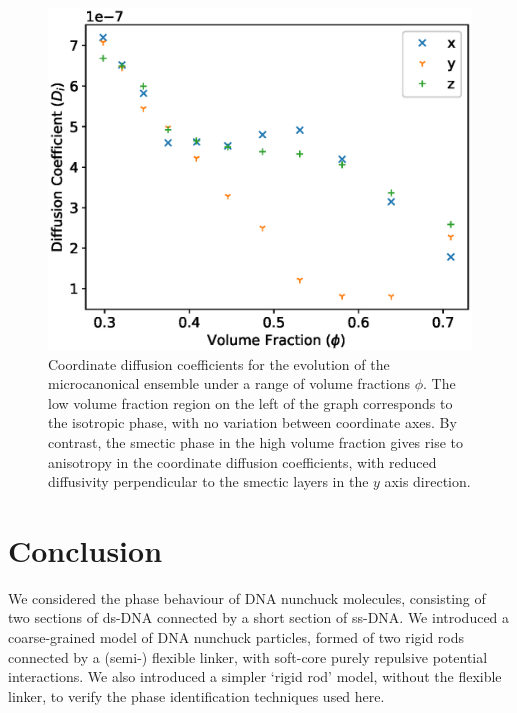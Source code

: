 \documentclass[11pt, a4paper]{article} %
\begin{document}
\begin{figure} [h!]
	\centering
	\includegraphics[width=0.7\linewidth]{Figures/nun_diff_Dcoeff}
	\caption{Coordinate diffusion coefficients for the evolution of the microcanonical ensemble under a range of volume fractions $\phi$. The low volume fraction region on the left of the graph corresponds to the isotropic phase, with no variation between coordinate axes. By contrast, the smectic phase in the high volume fraction gives rise to anisotropy in the coordinate diffusion coefficients, with reduced diffusivity perpendicular to the smectic layers in the $y$ axis direction.}
	\label{fig:nun_diff_Dcoeff}
\end{figure}  %



\section{Conclusion}

We considered the phase behaviour of DNA nunchuck molecules, consisting of two sections of ds-DNA connected by a short section of ss-DNA. We introduced a coarse-grained model of DNA nunchuck particles, formed of two rigid rods connected by a (semi-) flexible linker, with soft-core purely repulsive potential interactions. We also introduced a simpler `rigid rod' model, without the flexible linker, to verify the phase identification techniques used here.
\end{document}
